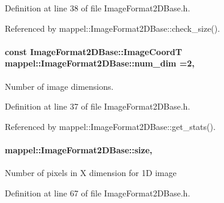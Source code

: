 Definition at line 38 of file Image\+Format2\+D\+Base.\+h.



Referenced by mappel\+::\+Image\+Format2\+D\+Base\+::check\+\_\+size().

\paragraph[{\texorpdfstring{num\+\_\+dim}{num_dim}}]{\setlength{\rightskip}{0pt plus 5cm}const {\bf Image\+Format2\+D\+Base\+::\+Image\+CoordT} mappel\+::\+Image\+Format2\+D\+Base\+::num\+\_\+dim =2\hspace{0.3cm}{\ttfamily [static]}, {\ttfamily [inherited]}}\hypertarget{classmappel_1_1ImageFormat2DBase_a9c29fcaf30faffc77b41ba556ebb0127}{}\label{classmappel_1_1ImageFormat2DBase_a9c29fcaf30faffc77b41ba556ebb0127}
Number of image dimensions. 

Definition at line 37 of file Image\+Format2\+D\+Base.\+h.



Referenced by mappel\+::\+Image\+Format2\+D\+Base\+::get\+\_\+stats().

\paragraph[{\texorpdfstring{size}{size}}]{ mappel\+::\+Image\+Format2\+D\+Base\+::size\hspace{0.3cm}{\ttfamily [protected]}, {\ttfamily [inherited]}}\hypertarget{classmappel_1_1ImageFormat2DBase_a3be77d2aa6ec9f3815322732950c2a60}{}\label{classmappel_1_1ImageFormat2DBase_a3be77d2aa6ec9f3815322732950c2a60}
Number of pixels in X dimension for 1D image 

Definition at line 67 of file Image\+Format2\+D\+Base.\+h.



